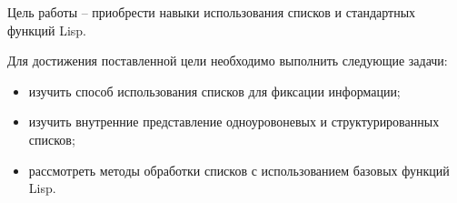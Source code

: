 \Introduction

Цель работы -- приобрести навыки использования списков и стандартных функций Lisp.

Для достижения поставленной цели необходимо выполнить следующие задачи:

\begin{itemize}[$\bullet$]
	\item изучить способ использования списков для фиксации информации;
	\item изучить внутренние представление одноуровоневых и структурированных списков;
	\item рассмотреть методы обработки списков с использованием базовых функций Lisp.
\end{itemize}
